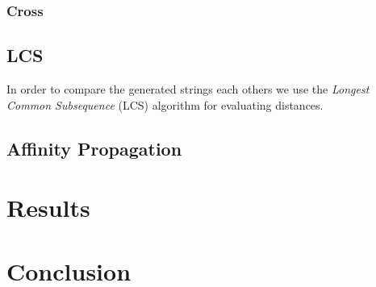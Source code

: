 \documentclass[a4paper,12pt]{article}
\begin{document}
\subsubsection{Cross}  
  
\subsection{LCS} 

In order to compare the generated strings each others we use the \emph{Longest Common Subsequence} (LCS) algorithm for evaluating distances.

 
 
\subsection{Affinity Propagation}

\section{Results}

\section{Conclusion} 
\end{document}
